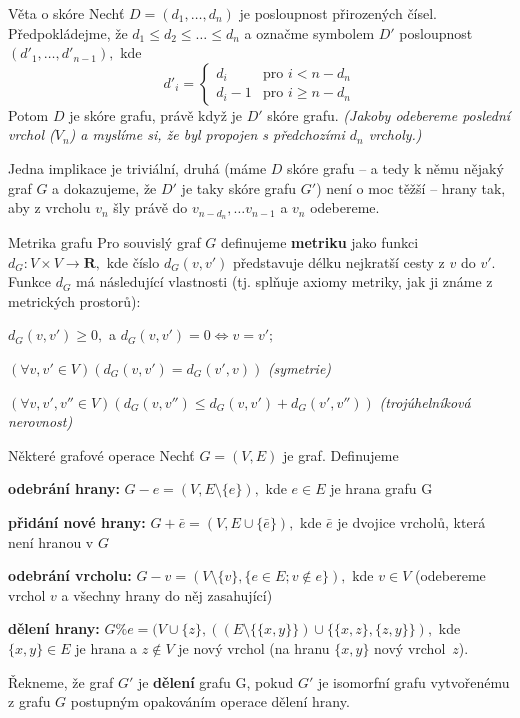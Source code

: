 \begin{vetaN}{Věta o skóre}
Nechť $D=(d_1,\dots,d_n)$ je posloupnost přirozených čísel. Předpokládejme, že $d_1\leq d_2 \leq \dots \leq d_n$ a označme symbolem $D'$ posloupnost $(d'_1, \dots, d'_{n-1}),$ kde
$$
d'_i =
\begin{cases}
d_i & \text{pro $i < n-d_n$}\\
d_i-1 & \text{pro $i \geq n-d_n$}
\end{cases}
$$
Potom $D$ je skóre grafu, právě když je $D'$ skóre grafu. \textit{(Jakoby odebereme poslední vrchol ($V_n$) a myslíme si, že byl propojen s předchozími $d_n$ vrcholy.)}

\medskip
\begin{dukaz}
Jedna implikace je triviální, druhá (máme $D$ skóre grafu -- a tedy k němu nějaký graf $G$ a dokazujeme, že $D'$ je taky skóre grafu $G'$) není o moc těžší --  hrany tak, aby z vrcholu $v_n$ šly právě do $v_{n-d_n},\dots v_{n-1}$ a $v_n$ odebereme.
\end{dukaz}
\end{vetaN}


\begin{definiceN}{Metrika grafu}
Pro souvislý graf $G$ definujeme \textbf{metriku} jako funkci $d_G: V \times V \rightarrow \textbf{R},$ kde číslo $d_G(v,v')$ představuje délku nejkratší cesty z $v$ do $v'.$ Funkce $d_G$ má následující vlastnosti (tj. splňuje axiomy metriky, jak ji známe z metrických prostorů):
\begin{penumerate}
\item $d_G(v,v') \geq 0,$ a $d_G(v,v')=0 \Leftrightarrow v=v';$
\item $(\forall v, v' \in V)(d_G(v,v')=d_G(v',v))$ \hfill \textit{(symetrie)}
\item $(\forall v, v', v'' \in V)(d_G(v, v'')\leq d_G(v,v')+d_G(v',v''))$ \hfill \textit{(trojúhelníková nerovnost)}
\end{penumerate}
\end{definiceN}


\begin{definiceN}{Některé grafové operace}
Nechť $G=(V,E)$ je graf. Definujeme
\begin{pitemize}
\item \textbf{odebrání hrany:} $G-e=(V,E \setminus \{e\}),$ kde $e \in E$ je hrana grafu G
\item \textbf{přidání nové hrany:} $G+\bar e=(V,E \cup \{\bar e\}),$ kde $\bar e$ je dvojice vrcholů, která není hranou v $G$
\item \textbf{odebrání vrcholu:} $G-v=(V \setminus \{v\}, \{e \in E; v \not \in e\}),$ kde $v \in V$ (odebereme vrchol $v$ a všechny hrany do něj zasahující)
\item \textbf{dělení hrany:} $G\%e=(V \cup \{z\},((E \setminus \{\{x,y\}\}) \cup \{\{x,z\},\{z,y\}\}),$ kde $\{x,y\} \in E$ je hrana a $z \not \in V$ je nový vrchol (na hranu $\{x,y\}$  nový vrchol~$z$).
\end{pitemize}
Řekneme, že graf $G'$ je \textbf{dělení} grafu G, pokud $G'$ je isomorfní grafu vytvořenému z grafu $G$ postupným opakováním operace dělení hrany.
\end{definiceN}


